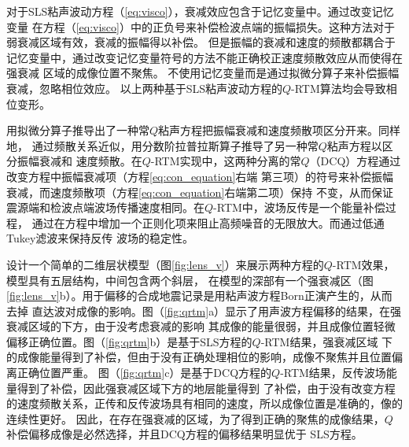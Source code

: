 对于SLS粘声波动方程（\ref{eq:visco}），衰减效应包含于记忆变量中。通过改变记忆变量
在方程（\ref{eq:visco}）中的正负号来补偿检波点端的振幅损失。这种方法对于弱衰减区域有效，衰减的振幅得以补偿。
但是振幅的衰减和速度的频散都耦合于记忆变量中，通过改变记忆变量符号的方法不能正确校正速度频散效应从而使得在强衰减
区域的成像位置不聚焦。 不使用记忆变量而是通过拟微分算子来补偿振幅衰减，忽略相位效应。
以上两种基于SLS粘声波动方程的$Q$-RTM算法均会导致相位变形。

 用拟微分算子推导出了一种常$Q$粘声方程把振幅衰减和速度频散项区分开来。同样地，
通过频散关系近似，用分数阶拉普拉斯算子推导了另一种常$Q$粘声方程以区分振幅衰减和
速度频散。在$Q$-RTM实现中，这两种分离的常$Q$（DCQ）方程通过改变方程中振幅衰减项（方程\ref{eq:con_equation}右端
第三项）的符号来补偿振幅衰减，而速度频散项（方程\ref{eq:con_equation}右端第二项）保持
不变，从而保证震源端和检波点端波场传播速度相同。在$Q$-RTM中，波场反传是一个能量补偿过程，
通过在方程中增加一个正则化项来阻止高频噪音的无限放大。而通过低通Tukey滤波来保持反传
波场的稳定性。

设计一个简单的二维层状模型（图\ref{fig:lens_v}）来展示两种方程的$Q$-RTM效果，模型具有五层结构，中间包含两个斜层，
在模型的深部有一个强衰减区（图\ref{fig:lens_v}b）。用于偏移的合成地震记录是用粘声波方程Born正演产生的，从而去掉
直达波对成像的影响。图（\ref{fig:qrtm}a）显示了用声波方程偏移的结果，在强衰减区域的下方，由于没考虑衰减的影响
其成像的能量很弱，并且成像位置轻微偏移正确位置。图（\ref{fig:qrtm}b）是基于SLS方程的$Q$-RTM结果，强衰减区域
下的成像能量得到了补偿，但由于没有正确处理相位的影响，成像不聚焦并且位置偏离正确位置严重。
图（\ref{fig:qrtm}c）是基于DCQ方程的$Q$-RTM结果，反传波场能量得到了补偿，因此强衰减区域下方的地层能量得到
了补偿，由于没有改变方程的速度频散关系，正传和反传波场具有相同的速度，所以成像位置是准确的，像的连续性更好。
因此，在存在强衰减的区域，为了得到正确的聚焦的成像结果，$Q$补偿偏移成像是必然选择，并且DCQ方程的偏移结果明显优于
SLS方程。

